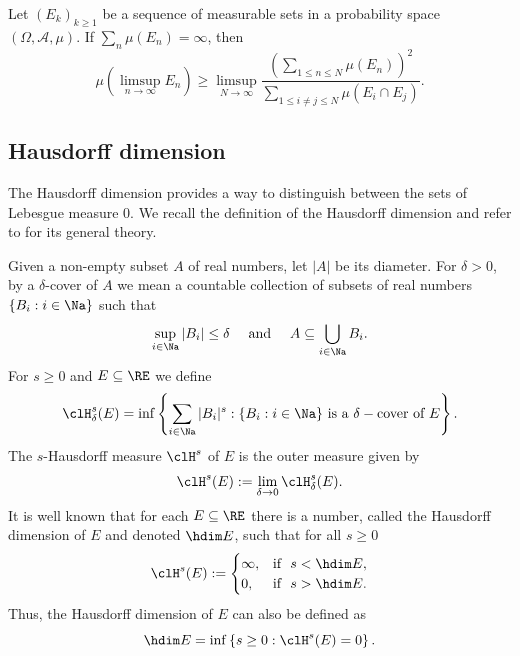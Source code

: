 \documentclass[12pt,a4paper]{amsart}
\begin{document}
\begin{lem01}\label{Le:ErdosChung}
Let $(E_k)_{k\geq 1}$ be a sequence of measurable sets in a probability space $(\Omega,\mathscr{A},\mu)$. If $\sum_{n}\mu(E_n)=\infty$, then
\[
\mu\left(\limsup_{n\to\infty} E_n\right)
\geq 
\limsup_{N\to\infty} \frac{\left( \displaystyle\sum_{1\leq n\leq N} \mu(E_n)\right)^2}{\displaystyle\sum_{1\leq i\neq j\leq N} \mu(E_i\cap E_j)}.
\]
\end{lem01}





\subsection{Hausdorff dimension}
The Hausdorff dimension provides a way to distinguish between the sets of Lebesgue measure $0$. We recall the definition of the Hausdorff dimension and refer to \cite{FalconerBookFractal} for its general theory.

Given a non-empty subset $A$ of real numbers, let $|A|$ be its diameter. For $\delta > 0$, by a $\delta$-cover of $A$ we mean a countable collection of subsets of real numbers $\{B_i:i\in\Na\}$ such that 
\[
\sup_{i\in\Na} |B_i|\leq \delta
\quad\text{ and }\quad
A\subseteq \bigcup_{i\in\Na} B_i.
\]
For $s\geq 0$ and $E\subseteq \RE$ we define
\[
\clH^s_{\delta}(E)
=
\inf\left\{\sum_{i\in\Na}|B_i|^s: \{B_i:i\in\Na\} \text{ is a }\delta-\text{cover of } E\right\}.
\]
The $s$-Hausdorff measure $\clH^s$ of $E$ is the outer measure given by
\[
\clH^s(E)
:=
\lim_{\delta\to 0} \clH^s_{\delta}(E).
\]
It is well known that for each $E\subseteq \RE$ there is a number, called the Hausdorff dimension of $E$ and denoted $\hdim E$, such that for all $s\geq 0$
\[
\clH^s(E)
:=
\begin{cases}
\infty, & \text{if} \ \ s< \hdim E,\\
0, & \text{if} \ \  s> \hdim E.
\end{cases}
\]
Thus, the Hausdorff dimension of $E$ can also be defined as
\[
\hdim E
=
\inf\left\{ s\geq 0: \clH^s(E)=0\right\}.
\]
\end{document}
